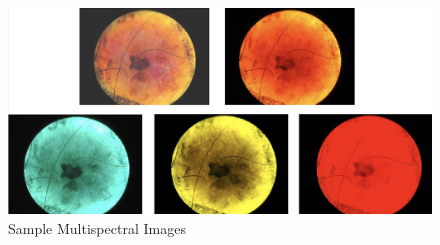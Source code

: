 \begin{figure}
    \centerline{\includegraphics[width=1\columnwidth]{02-related-works/figures/sample-multispectral-images.png}}
    \caption{Sample Multispectral Images \cite{dhawan2009multispectral}}
    \label{fig:sample-multispectral-images}
\end{figure}